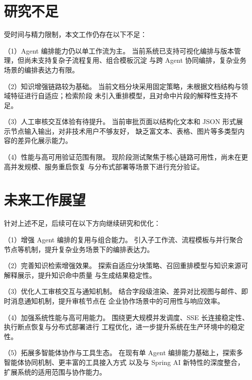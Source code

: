 \section*{研究不足}

受时间与精力限制，本文工作仍存在以下不足：

（1）Agent 编排能力仍以单工作流为主。
当前系统已支持可视化编排与版本管理，但尚未支持复杂子流程复用、组合模板沉淀
与跨 Agent 协同编排，复杂业务场景的编排表达力有限。

（2）知识增强链路较为基础。
当前文档分块采用固定策略，未根据文档结构与领域特征进行自适应；检索阶段
未引入重排模型，且对命中片段的解释性支持不足。

（3）人工审核交互体验有待提升。
当前审批页面以结构化文本和 JSON 形式展示节点输入输出，对非技术用户不够友好，
缺乏富文本、表格、图片等多类型内容的差异化展示能力。

（4）性能与高可用验证范围有限。
现阶段测试聚焦于核心链路可用性，尚未在更高并发规模、服务重启恢复
与分布式部署等场景下进行充分验证。

\section*{未来工作展望}

针对上述不足，后续可在以下方向继续研究和优化：

（1）增强 Agent 编排的复用与组合能力。
引入子工作流、流程模板与并行聚合节点等机制，提升复杂业务场景下的编排表达力。

（2）完善知识检索增强效果。
探索自适应分块策略、召回重排模型与知识来源可解释展示，提升知识命中质量
与生成结果稳定性。

（3）优化人工审核交互与通知机制。
结合字段级渲染、差异对比视图与邮件、即时消息通知机制，提升审核节点在
企业协作场景中的可用性与响应效率。

（4）加强系统性能与高可用能力。
围绕更大规模并发调度、SSE 长连接稳定性、执行断点恢复与分布式部署进行
工程优化，进一步提升系统在生产环境中的稳定性。

（5）拓展多智能体协作与工具生态。
在现有单 Agent 编排能力基础上，探索多智能体协同机制、更丰富的工具接入方式
以及与 Spring AI 新特性的深度整合，扩展系统的适用范围与协作能力。
